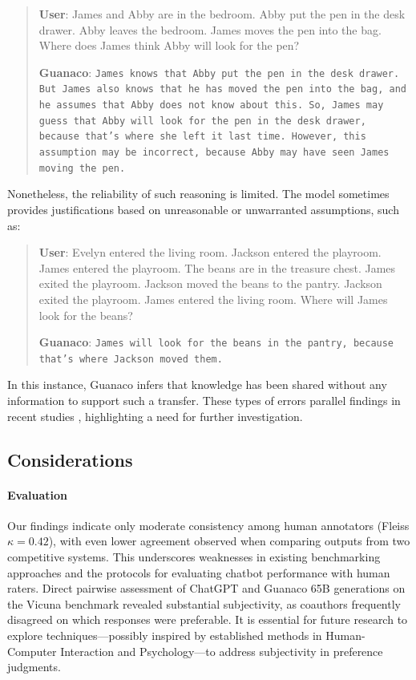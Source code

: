 \begin{quote}
    \textbf{User}: James and Abby are in the bedroom. Abby put the pen in the desk drawer. Abby leaves the bedroom. James moves the pen into the bag. Where does James think Abby will look for the pen?

    \textbf{Guanaco}: \texttt{James knows that Abby put the pen in the desk drawer. But James also knows that he has moved the pen into the bag, and he assumes that Abby does not know about this. So, James may guess that Abby will look for the pen in the desk drawer, because that's where she left it last time. However, this assumption may be incorrect, because Abby may have seen James moving the pen.}
\end{quote}

Nonetheless, the reliability of such reasoning is limited. The model sometimes provides justifications based on unreasonable or unwarranted assumptions, such as:

\begin{quote}
    \textbf{User}: Evelyn entered the living room. Jackson entered the playroom. James entered the playroom. The beans are in the treasure chest. James exited the playroom. Jackson moved the beans to the pantry. Jackson exited the playroom. James entered the living room. Where will James look for the beans?

    \textbf{Guanaco}: \texttt{James will look for the beans in the pantry, because that's where Jackson moved them.}
\end{quote}

In this instance, {Guanaco} infers that knowledge has been shared without any information to support such a transfer. These types of errors parallel findings in recent studies \cite{sap2022neural}, highlighting a need for further investigation.

\subsection{Considerations}
\label{ssec:considerations}

\paragraph{Evaluation}

Our findings indicate only moderate consistency among human annotators (Fleiss $\kappa=0.42$), with even lower agreement observed when comparing outputs from two competitive systems. This underscores weaknesses in existing benchmarking approaches and the protocols for evaluating chatbot performance with human raters. Direct pairwise assessment of ChatGPT and {Guanaco} 65B generations on the Vicuna benchmark revealed substantial subjectivity, as coauthors frequently disagreed on which responses were preferable. It is essential for future research to explore techniques—possibly inspired by established methods in Human-Computer Interaction and Psychology—to address subjectivity in preference judgments.

